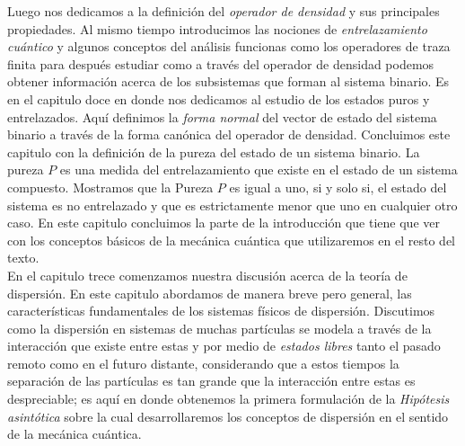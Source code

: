 \documentclass[12pt]{book}
\numberwithin{equation}{chapter}
\begin{document}
Luego nos dedicamos a la definici\'on del \emph{operador de densidad} y sus principales propiedades. Al mismo tiempo introducimos las nociones de \emph{entrelazamiento cu\'antico} y algunos conceptos del an\'alisis funcionas como los operadores de traza finita  para despu\'es estudiar como a trav\'es del operador de densidad podemos obtener informaci\'on acerca de los subsistemas que forman al sistema binario. Es en el capitulo doce en donde nos dedicamos al estudio de los estados puros y entrelazados. Aqu\'i definimos la \emph{forma normal} del vector de estado del sistema binario a trav\'es de la forma can\'onica del operador de densidad. Concluimos este capitulo con la definici\'on de la pureza del estado de un sistema binario. La pureza $P$ es una medida del entrelazamiento que existe en el estado de un sistema compuesto. Mostramos que la Pureza $P$ es igual a uno, si y solo si, el estado del sistema es no entrelazado y que es estrictamente menor que uno en cualquier otro caso. En este capitulo concluimos la parte de la introducci\'on que tiene que ver con los conceptos b\'asicos de la mec\'anica cu\'antica que utilizaremos en el resto del texto.\\

En el capitulo trece comenzamos nuestra discusi\'on acerca de la teor\'ia de dispersi\'on. En este capitulo abordamos de manera breve pero general, las caracter\'isticas fundamentales de los sistemas f\'isicos de dispersi\'on. Discutimos como la dispersi\'on en sistemas de muchas part\'iculas se modela a trav\'es de la interacci\'on que existe entre estas y por medio de \emph{estados libres} tanto el pasado remoto como en el futuro distante, considerando que a estos tiempos la separaci\'on de las part\'iculas es tan grande que la interacci\'on entre estas es despreciable; es aqu\'i en donde obtenemos la primera formulaci\'on de la \emph{Hip\'otesis asint\'otica} sobre la cual desarrollaremos los conceptos de dispersi\'on en el sentido de la mec\'anica cu\'antica.\\
\end{document}
